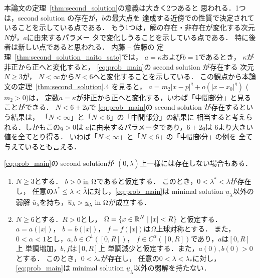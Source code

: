 本論文の定理~\ref{thm:second_solution}の意義は大きく2つあると
思われる．1つは，second solution の存在が，$b$の最大点を
達成する近傍での性質で決定されていることを示している点である．
もう1つは，解の存在・非存在が変化する次元$N$が，$a$に由来するパラメー
タで変化しうることを示している点である．
特に後者は新しい点であると思われる．
内藤 -- 佐藤の
定理~\ref{thm:second_solution_naito_sato}では，
$a = \kappa$および$b = 1$であるとき，
$\kappa$が非正から正へと変化すると，
\ref{eq:prob_main}の second solution が存在する
次元$N \geq 3$が，
$N < \infty$から$N < 6$へと変化することを示している．
この観点から本論文の定理~\ref{thm:second_solution}.4 を見ると，
$a = m_2 \lvert x - p \rvert^{q} + o(\lvert x-x_0
\rvert^{q})$ ($m_2 > 0$)は，
定数$a = \kappa$が非正から正へと変化する，いわば「中間部分」と見ることができる．
$N < 6 + 2q$で
\ref{eq:prob_main}の second solution が存在するという結果は，
「$N < \infty$」と「$N < 6$」の「中間部分」の結果に
相当すると考えられる．しかもこの$q > 0$は
$a$に由来するパラメータであり，$6 + 2q$は
$6$より大きい値を全てとり得る．
いわば「$N < \infty$」と「$N < 6$」の「中間部分」の例を
全て与えているとも言える．

\ref{eq:prob_main}の second solutionが
$(0, \bar{\lambda})$上一様には存在しない場合もある．

\begin{thm} \label{thm:second_solution_nonex}
 \begin{enumerate}[1.]  \sage
  \item $N \geq 3$とする．
        $b > 0 ~\text{in}~ \Omega$であると仮定する．
        このとき，$0 < \lambda^* < \bar{\lambda}$が存在し，
        任意の$\lambda^* \leq
        \lambda < \bar{\lambda}$に対し，\ref{eq:prob_main}は
        minimal solution $\underline{u}_\lambda$以外の弱解
        $\bar{u}_\lambda$を持ち，$\overline{u}_\lambda >
        \underline{u}_\lambda ~\text{in}~ \Omega$が成立する．
  \item $N \geq 6$とする．$R > 0$とし，
        $\Omega = \{ x \in \mathbb{R}^N \mid \lvert x \rvert < R\}$
        と仮定する．
        $a = a(\lvert x \rvert)$，
        $b = b(\lvert x \rvert)$，
        $f = f(\lvert x \rvert)$は$\Omega$上球対称とする．
        また，$0 < \alpha < 1$とし，$a , b \in C^1([0, R])$，
        $f \in C^\alpha([0, R])$であり，$a$は$[0, R]$上
        単調増加，$b, f$は$[0, R]$上
        単調減少と仮定する．また，$a(0), b(0) > 0$とする．
        このとき，$0 < \lambda_*$が存在し，
        任意の$0 < \lambda < \lambda_*$に対し，
        \ref{eq:prob_main}は
        minimal solution $\underline{u}_\lambda$以外の弱解を持たない．
 \end{enumerate}
\end{thm}

